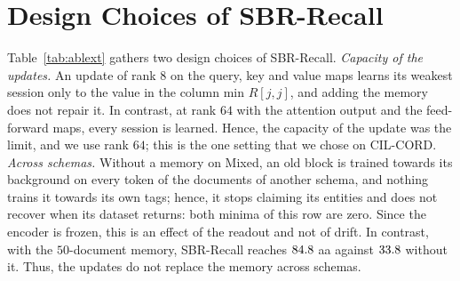 \section{Design Choices of SBR-Recall}
\label{app:recall-design}

Table~\ref{tab:ablext} gathers two design choices of SBR-Recall. \emph{Capacity of the
updates.} An update of rank $8$ on the query, key and value maps learns its weakest
session only to the value in the column min $R[j,j]$, and adding the memory does not
repair it. In contrast, at rank $64$ with the attention output and the feed-forward maps,
every session is learned. Hence, the capacity of the update was the limit, and we use rank
$64$; this is the one setting that we chose on CIL-CORD. \emph{Across schemas.} Without a
memory on Mixed, an old block is trained towards its background on every token of the
documents of another schema, and nothing trains it towards its own tags; hence, it stops
claiming its entities and does not recover when its dataset returns: both minima of this
row are zero. Since the encoder is frozen, this is an effect of the readout and not of
drift. In contrast, with the $50$-document memory, SBR-Recall reaches $84.8$
\gls{aa} against $33.8$ without it. Thus, the updates do not replace the
memory across schemas.

\begin{table}[!htbp]
  \centering
  \caption[Design choices of SBR-Recall]{\textbf{Design choices of SBR-Recall} (AA, mean
  $\pm$ s.d.). Min $R[j,j]$: the lowest F1 of a session right after it is learned; min
  $R[T,j]$: the lowest final F1 of a session, both over all runs.}
  \label{tab:ablext}
  \small
\end{table}
